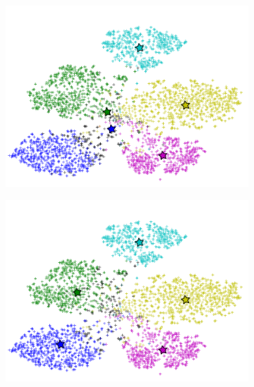 \documentclass[letterpaper]{article}
\begin{document}
\begin{figure}[t]
\begin{subfigure}[b]{0.27\linewidth}
    \caption{}
\label{fig:kmeans}
  \end{subfigure}
%
  \begin{subfigure}[b]{0.27\linewidth}
    \includegraphics[width=\linewidth]{figure_3}
    \caption{}
    \label{fig:clustering}
  \end{subfigure}
%
  \begin{subfigure}[b]{0.27\linewidth}
    \label{fig:joint}
    \includegraphics[width=\linewidth]{figure_4}
    \caption{}
  \end{subfigure}

\end{figure}
\end{document}
